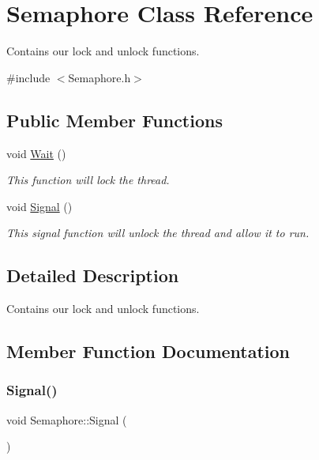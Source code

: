 \hypertarget{class_semaphore}{}\section{Semaphore Class Reference}
\label{class_semaphore}


Contains our lock and unlock functions.  




{\ttfamily \#include $<$Semaphore.\+h$>$}

\subsection*{Public Member Functions}
\begin{DoxyCompactItemize}
\item 
void \mbox{\hyperlink{class_semaphore_a72aabebf026e3a8b1f3e4d0fa8ee1eda}{Wait}} ()
\begin{DoxyCompactList}\small\item\em This function will lock the thread. \end{DoxyCompactList}\item 
void \mbox{\hyperlink{class_semaphore_a86f92f738b4486439b296d8e235895f2}{Signal}} ()
\begin{DoxyCompactList}\small\item\em This signal function will unlock the thread and allow it to run. \end{DoxyCompactList}\end{DoxyCompactItemize}


\subsection{Detailed Description}
Contains our lock and unlock functions. 

\subsection{Member Function Documentation}
\mbox{\label{class_semaphore_a86f92f738b4486439b296d8e235895f2}} 
\subsubsection{\texorpdfstring{Signal()}{Signal()}}
{\footnotesize\ttfamily void Semaphore\+::\+Signal (\begin{DoxyParamCaption}{ }\end{DoxyParamCaption})}



